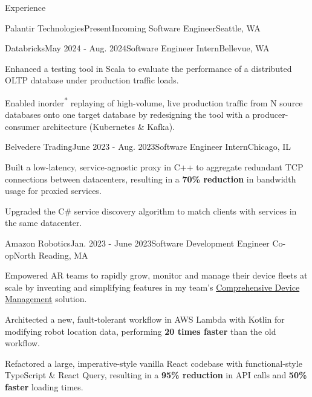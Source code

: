 \documentclass{resume}
\begin{document}
  \begin{rSection}{Experience}

    \begin{rSubsection}{Palantir Technologies}{Present}{Incoming Software Engineer}{Seattle, WA}
    \end{rSubsection}

    \begin{rSubsection}{Databricks}{May 2024 - Aug. 2024}{Software Engineer Intern}{Bellevue, WA}
      \item Enhanced a testing tool in Scala to evaluate the performance of a distributed
      OLTP database under production traffic loads.
      \item Enabled inorder\textsuperscript{*} replaying of high-volume, live production traffic from N source databases onto one 
      target database by redesigning the tool with a producer-consumer architecture (Kubernetes \& Kafka).
    \end{rSubsection}

    \begin{rSubsection}{Belvedere Trading}{June 2023 - Aug. 2023}{Software Engineer Intern}{Chicago, IL}
      \item Built a low-latency, service-agnostic proxy in C++ to aggregate redundant TCP
        connections between datacenters, resulting in a \textbf{70\% reduction} in bandwidth usage for proxied services.
      \item Upgraded the C\# service discovery algorithm to match clients with services in the same datacenter.
    \end{rSubsection}

    \begin{rSubsection}{Amazon Robotics}{Jan. 2023 - June 2023}{Software Development Engineer Co-op}{North Reading, MA}
      \item Empowered AR teams to rapidly grow, monitor and manage their device fleets at scale by inventing and simplifying
        features in my team's 
        \href{https://www.allthingsdistributed.com/2021/07/amazon-robotics-on-aws.html}{Comprehensive Device Management} solution. 
      \item Architected a new, fault-tolerant workflow in AWS Lambda with Kotlin for modifying 
        robot location data, performing \textbf{20 times faster} than the old workflow.
      \item Refactored a large, imperative-style vanilla React codebase with functional-style 
        TypeScript \& React Query, resulting in a \textbf{95\% reduction} in API calls and \textbf{50\% faster} loading times.
    \end{rSubsection}


\end{rSection}
\end{document}

